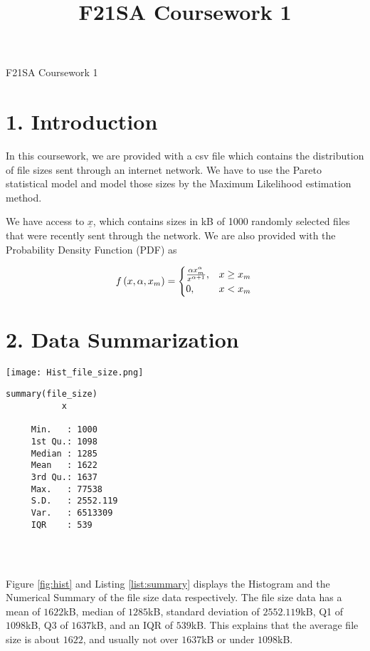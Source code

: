 \documentclass[11pt]{article}
\title{F21SA Coursework 1\Large }
\begin{document}
\begin{center}
  \Large{F21SA Coursework 1}
\end{center}

\section*{1. Introduction}

In this coursework, we are provided with a csv file which contains the distribution of file sizes sent through an internet network. We have to use the Pareto statistical model and model those sizes by the Maximum Likelihood estimation method.

We have access to $\underline{x}$, which contains sizes in kB of 1000 randomly selected files that were recently sent through the network. We are also provided with the Probability Density Function (PDF) as 

\begin{equation}
f\left(x, \alpha, x_{m}\right)= \begin{cases}\frac{\alpha x_{m}^{\alpha}}{x^{\alpha+1}}, & x \geq x_{m} \\ 0, & x<x_{m}\end{cases}\\
\end{equation}

\section*{2. Data Summarization}

\begin{minipage}{0.5\textwidth}
    \centering
    \texttt{[image: Hist\_file\_size.png]}
    \label{fig:hist}
\end{minipage}
\begin{minipage}{0.5\textwidth}
    \centering
    \begin{lstlisting}[caption={Numerical Summary},
                        label={list:summary},
                        captionpos=b]
     summary(file_size)
           x         
           
     Min.   : 1000  
     1st Qu.: 1098  
     Median : 1285 
     Mean   : 1622  
     3rd Qu.: 1637  
     Max.   : 77538
     S.D.   : 2552.119
     Var.   : 6513309
     IQR    : 539
     
    \end{lstlisting}
\end{minipage} \\
\par Figure \ref{fig:hist} and Listing \ref{list:summary} displays the Histogram and the Numerical Summary of the file size data respectively. The file size data has a mean of $1622$kB, median of $1285$kB, standard deviation of $2552.119$kB, Q1 of $1098$kB, Q3 of $1637$kB, and an IQR of $539$kB. This explains that the average file size is about $1622$, and usually not over $1637$kB or under $1098$kB.\\
\end{document}
